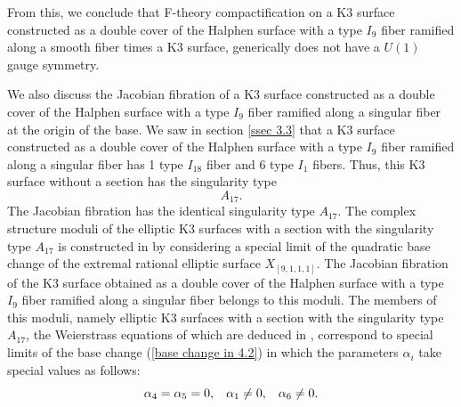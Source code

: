 \documentclass[12pt]{article}
\begin{document}
\par From this, we conclude that F-theory compactification on a K3 surface constructed as a double cover of the Halphen surface with a type $I_9$ fiber ramified along a smooth fiber times a K3 surface, generically does not have a $U(1)$ gauge symmetry.
\par We also discuss the Jacobian fibration of a K3 surface constructed as a double cover of the Halphen surface with a type $I_9$ fiber ramified along a singular fiber at the origin of the base. We saw in section \ref{ssec 3.3} that a K3 surface constructed as a double cover of the Halphen surface with a type $I_9$ fiber ramified along a singular fiber has 1 type $I_{18}$ fiber and 6 type $I_1$ fibers. Thus, this K3 surface without a section has the singularity type 
\begin{equation}
A_{17}.
\end{equation}
The Jacobian fibration has the identical singularity type $A_{17}$. The complex structure moduli of the elliptic K3 surfaces with a section with the singularity type $A_{17}$ is constructed in \cite{KimuraMizoguchi} by considering a special limit of the quadratic base change of the extremal rational elliptic surface $X_{[9, 1, 1, 1]}$. The Jacobian fibration of the K3 surface obtained as a double cover of the Halphen surface with a type $I_9$ fiber ramified along a singular fiber belongs to this moduli. The members of this moduli, namely elliptic K3 surfaces with a section with the singularity type $A_{17}$, the Weierstrass equations of which are deduced in \cite{KimuraMizoguchi}, correspond to special limits of the base change (\ref{base change in 4.2}) in which the parameters $\alpha_i$ take special values as follows:
\begin{equation}
\alpha_4=\alpha_5=0, \hspace{3mm} \alpha_1\ne 0, \hspace{3mm} \alpha_6\ne 0.
\end{equation}
\end{document}
